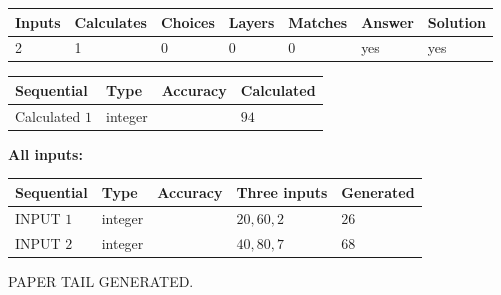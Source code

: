 \documentclass[12pt]{article}
\begin{document}
 
\noindent{}
 
 

 
   
   
   
   
\noindent\begin{tabular}{|l|l|l|l|l|l|l|}
 \hline
Inputs & Calculates & Choices & Layers & Matches & Answer & Solution \\ \hline
 2  & 
 1  & 
 0
  & 
 0  & 
 0  & 
  yes & 
  yes 
  \\ \hline
 \end{tabular}
   
   
   
   
\noindent{}
   
   
  
  
\noindent\begin{tabular}{|l|l|l|l|}
\hline
 Sequential & Type & Accuracy & Calculated \\ 
\hline
 
 
  Calculated $  1 $ & integer &  & 
  $ 94 $ 
 \\  \hline  
 \end{tabular}
   
   
   
   
\noindent\vspace{0.1in}\hspace{-0.08in} {\textbf{\Large{All inputs: }}}
   
   
  
  
\noindent\begin{tabular}{|l|l|l|l|l|}
\hline
 Sequential & Type & Accuracy & Three inputs & Generated \\ 
\hline
 
 
  INPUT $  1 $ & integer &  & $
 20
 , 
 60
 , 
 2
 $ & $ 26 $ 
 \\  \hline  
 
 
  INPUT $  2 $ & integer &  & $
 40
 , 
 80
 , 
 7
 $ & $ 68 $ 
 \\  \hline  
 \end{tabular}
   
   
   
   
   
   
 \vspace{0.2in}
 
   
   
\vspace{2.0in} PAPER TAIL GENERATED.
   
\end{document}

